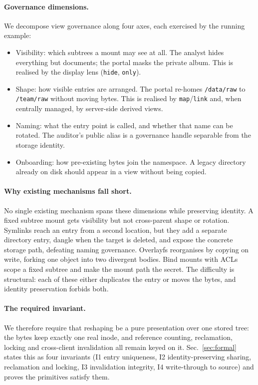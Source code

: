 \documentclass[numberedsection,acmtos]{acmart}
\begin{document}
\paragraph{Governance dimensions.}
We decompose view governance along four axes, each exercised by the running
example:
\begin{itemize}
  \item Visibility: which subtrees a mount may see at all. The analyst hides
        everything but documents; the portal masks the private album. This is
        realised by the display lens (\texttt{hide}, \texttt{only}).
  \item Shape: how visible entries are arranged. The portal
        re-homes \texttt{/data/raw} to \texttt{/team/raw} without moving bytes.
        This is realised by \texttt{map}/\texttt{link} and, when centrally
        managed, by server-side derived views.
  \item Naming: what the entry point is called, and whether that
        name can be rotated. The auditor's public alias is a governance handle
        separable from the storage identity.
  \item Onboarding: how pre-existing bytes join the namespace. A
        legacy directory already on disk should appear in a view without being
        copied.
\end{itemize}

\paragraph{Why existing mechanisms fall short.}
No single existing mechanism spans these dimensions while preserving identity.
A fixed subtree mount gets visibility but not cross-parent shape or rotation.
Symlinks reach an entry from a second location, but they add a separate
directory entry, dangle when the target is deleted, and expose the concrete
storage path, defeating naming governance. Overlayfs reorganises by copying on
write, forking one object into two divergent bodies. Bind mounts with ACLs scope
a fixed subtree and make the mount path the secret. The difficulty is
structural: each of these either duplicates the entry or moves the bytes, and
identity preservation forbids both.

\paragraph{The required invariant.}
We therefore require that reshaping be a pure presentation over one stored
tree: the bytes keep exactly one real inode, and reference counting,
reclamation, locking and cross-client invalidation all remain keyed on it.
Sec.~\ref{sec:formal} states this as four invariants (I1 entry uniqueness, I2
identity-preserving sharing, reclamation and locking, I3 invalidation integrity,
I4 write-through to source) and proves the primitives satisfy them.
\end{document}
